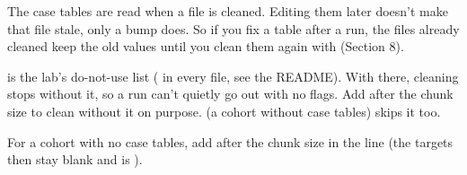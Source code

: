 The case tables are read when a file is cleaned. Editing them later doesn't make that file stale, only a  bump does. So if you fix a table after a run, the files already cleaned keep the old values until you clean them again with  (Section 8).

 is the lab's do-not-use list ( in every file, see the README). With  there, cleaning stops without it, so a run can't quietly go out with no flags. Add  after the chunk size to clean without it on purpose.  (a cohort without case tables) skips it too.

For a cohort with no case tables, add  after the chunk size in the  line (the targets then stay blank and  is ).

